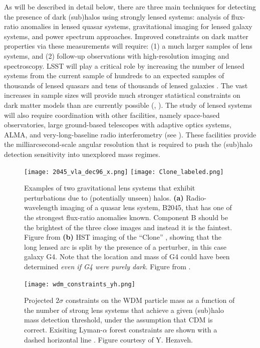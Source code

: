 As will be described in detail below, there are three main techniques for detecting the presence of dark (sub)halos using strongly lensed systems: analysis of flux-ratio anomalies in lensed quasar systems,
gravitational imaging for lensed galaxy systems, and power spectrum approaches. 
Improved constraints on dark matter properties via these measurements will require: (1) a much larger samples of lens systems, and (2) follow-up observations with high-resolution imaging and spectroscopy.
LSST will play a critical role by increasing the number of lensed systems from the current sample of hundreds to an expected samples of thousands of lensed quasars \citep{O+M10} and tens of thousands of lensed galaxies \citep{Collett2015}.
The vast increases in sample sizes will provide much stronger statistical constraints on dark matter models than are currently possible (\eg, ).
The study of lensed systems will also require coordination with other facilities, namely space-based observatories, large ground-based telescopes with adaptive optics systems, ALMA, and very-long-baseline radio interferometry (see ). These facilities provide the milliarcsecond-scale angular resolution that is required to push the (sub)halo detection sensitivity into unexplored mass regimes.

\begin{figure}
    \centering
    \texttt{[image: 2045\_vla\_dec96\_x.png]}    
    \texttt{[image: Clone\_labeled.png]}
    \caption{Examples of two gravitational lens systems that exhibit perturbations due to (potentially unseen) halos.  {\bf (a)} Radio-wavelength imaging of a quasar lens system, B2045, that has one of the strongest flux-ratio anomalies known.  Component B should be the brightest of the three close images and instead it is the faintest. Figure from \citet{Fassnacht++99}
    {\bf (b)} HST imaging of the ``Clone'' \citep{2009ApJ...699.1242L}, showing that the long lensed arc is split by the presence of a perturber, in this case galaxy G4.  Note that the location and mass of G4 could have been determined {\em even if G4 were purely dark}.  Figure from \citet{Vegetti_2010_1}.}
    \label{fig:stronglens_examples}
\end{figure}

\begin{figure}
    \centering
    \texttt{[image: wdm\_constraints\_yh.png]}
    \caption{ \label{fig:lensing_wdmlim_vs_nlens} Projected $2\sigma$ constraints on the WDM particle mass as a function of the number of strong lens systems that achieve a given (sub)halo mass detection threshold, under the assumption that CDM is correct. Exisiting Lyman-$\alpha$ forest constraints are shown with a dashed horizontal line \citep{2017PhRvD..96b3522I}. Figure courtesy of Y. Hezaveh.
}
\end{figure}


